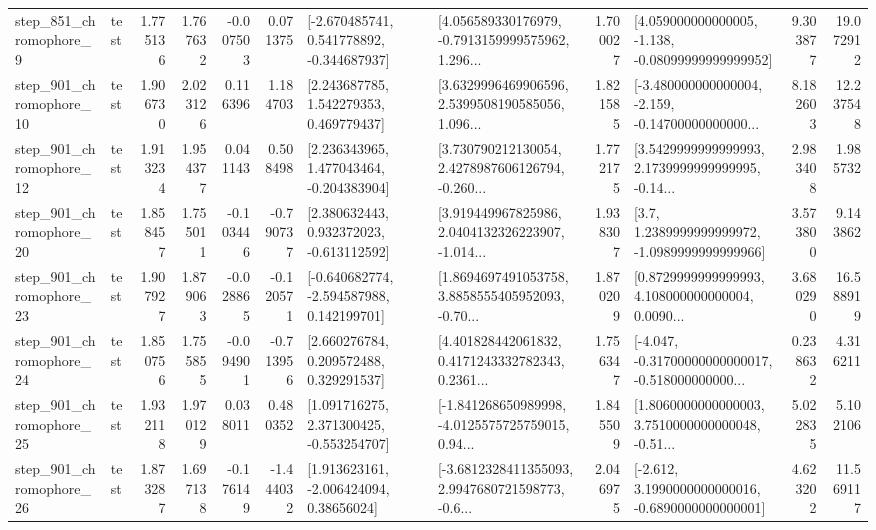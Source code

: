 \begin{tabular}{llrrrrllrlrr}
   step\_851\_chromophore\_9 &      test &      1.775136 &    1.767632 &     -0.007503 &  0.071375 &   [-2.670485741, 0.541778892, -0.344687937] &  [4.056589330176979, -0.7913159999575962, 1.296... &       1.700027 &  [4.059000000000005, -1.138, -0.08099999999999952] &            9.303877 &         19.072912 \\
  step\_901\_chromophore\_10 &      test &      1.906730 &    2.023126 &      0.116396 &  1.184703 &     [2.243687785, 1.542279353, 0.469779437] &  [3.6329996469906596, 2.5399508190585056, 1.096... &       1.821585 &  [-3.480000000000004, -2.159, -0.14700000000000... &            8.182603 &         12.237548 \\
  step\_901\_chromophore\_12 &      test &      1.913234 &    1.954377 &      0.041143 &  0.508498 &    [2.236343965, 1.477043464, -0.204383904] &  [3.730790212130054, 2.4278987606126794, -0.260... &       1.772175 &  [3.5429999999999993, 2.1739999999999995, -0.14... &            2.983408 &          1.985732 \\
  step\_901\_chromophore\_20 &      test &      1.858457 &    1.755011 &     -0.103446 & -0.790737 &    [2.380632443, 0.932372023, -0.613112592] &  [3.919449967825986, 2.0404132326223907, -1.014... &       1.938307 &     [3.7, 1.2389999999999972, -1.0989999999999966] &            3.573800 &          9.143862 \\
  step\_901\_chromophore\_23 &      test &      1.907927 &    1.879063 &     -0.028865 & -0.120571 &   [-0.640682774, -2.594587988, 0.142199701] &  [1.8694697491053758, 3.8858555405952093, -0.70... &       1.870209 &  [0.8729999999999993, 4.108000000000004, 0.0090... &            3.680290 &         16.588919 \\
  step\_901\_chromophore\_24 &      test &      1.850756 &    1.755855 &     -0.094901 & -0.713956 &     [2.660276784, 0.209572488, 0.329291537] &  [4.401828442061832, 0.4171243332782343, 0.2361... &       1.756347 &  [-4.047, -0.31700000000000017, -0.518000000000... &            0.238632 &          4.316211 \\
  step\_901\_chromophore\_25 &      test &      1.932118 &    1.970129 &      0.038011 &  0.480352 &    [1.091716275, 2.371300425, -0.553254707] &  [-1.841268650989998, -4.0125575725759015, 0.94... &       1.845509 &  [1.8060000000000003, 3.7510000000000048, -0.51... &            5.022835 &          5.102106 \\
  step\_901\_chromophore\_26 &      test &      1.873287 &    1.697138 &     -0.176149 & -1.444032 &     [1.913623161, -2.006424094, 0.38656024] &  [-3.6812328411355093, 2.9947680721598773, -0.6... &       2.046975 &  [-2.612, 3.1990000000000016, -0.6890000000000001] &            4.623202 &         11.569117 \\

\end{tabular}
